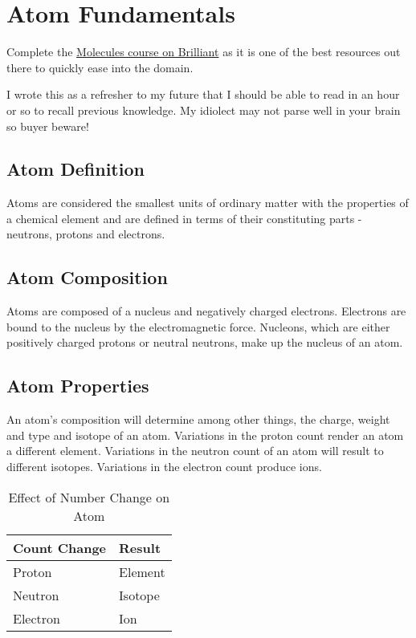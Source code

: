 \section{Atom Fundamentals}

\begin{tcolorbox}[colback=green!5!white,colframe=green!75!black,title=Tip]
Complete the
\href{https://brilliant.org/courses/molecular-representations/}{Molecules course
on Brilliant} as it is one of the best resources out there to quickly ease into
the domain.
\end{tcolorbox}

\begin{tcolorbox}[colback=red!5!white,colframe=red!75!black,title=Warning] I
wrote this as a refresher to my future that I should be able to read in an hour
or so to recall previous knowledge. My idiolect may not parse well in your
brain so buyer beware!
\end{tcolorbox}

\subsection{Atom Definition} Atoms are considered the smallest units
of ordinary matter with the properties of a chemical element and are defined in
terms of their constituting parts - neutrons, protons and electrons.

\subsection{Atom Composition} Atoms are composed of a nucleus and
negatively charged electrons. Electrons are bound to the nucleus
by the electromagnetic force.  Nucleons, which are either
positively charged protons or neutral neutrons,
make up the nucleus of an atom.

\subsection{Atom Properties} An atom's composition will determine among other
things, the charge, weight and type and isotope of an atom. Variations in the
proton count render an atom a different element. Variations in the neutron
count of an atom will result to different isotopes. Variations in
the electron count produce ions.

\begin{table}[h] \caption{Effect of Number Change on Atom}
\begin{tabularx}{\linewidth}{|X|X|} \hline Count Change & Result \\ \hline
Proton & Element \\ Neutron & Isotope \\ Electron & Ion \\ \hline \end{tabularx}
\end{table}


